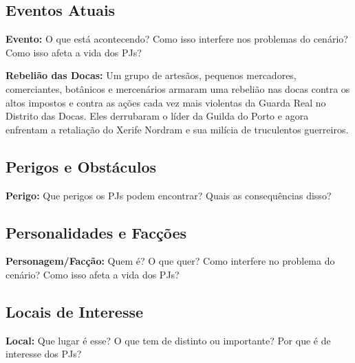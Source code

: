 \documentclass{article}
\begin{document}
\subsection{Eventos Atuais}

\textbf{Evento:} O que está acontecendo? Como isso interfere nos problemas do cenário? Como isso afeta a vida dos PJs?

\textbf{Rebelião das Docas:} Um grupo de artesãos, pequenos mercadores, comerciantes, botânicos e mercenários armaram uma rebelião nas docas contra os altos impostos e contra as ações cada vez mais violentas da Guarda Real no Distrito das Docas. Eles derrubaram o líder da Guilda do Porto e agora enfrentam a retaliação do Xerife Nordram e sua milícia de truculentos guerreiros.  

\subsection{Perigos e Obstáculos}

\textbf{Perigo:} Que perigos os PJs podem encontrar? Quais as consequências disso?

\subsection{Personalidades e Facções}

\textbf{Personagem/Facção:} Quem é? O que quer? Como interfere no problema do cenário? Como isso afeta a vida dos PJs?

\subsection{Locais de Interesse}

\textbf{Local:} Que lugar é esse? O que tem de distinto ou importante? Por que é de interesse dos PJs?
\end{document}
